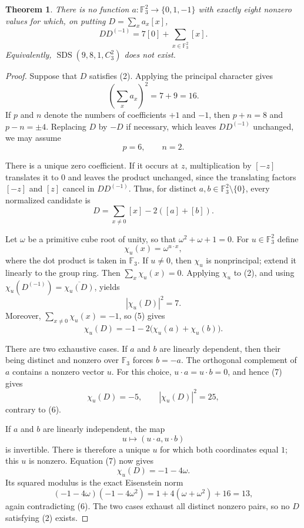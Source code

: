 \documentclass[11pt]{article}
\newtheorem{theorem}{Theorem}
\newcommand{\F}{\mathbb F}
\begin{document}
\begin{theorem}
There is no function $a\colon\F_3^2\to\{0,1,-1\}$ with exactly eight
nonzero values for which, on putting $D=\sum_x a_x[x]$,
\begin{equation}
 DD^{(-1)}=7[0]+\sum_{x\in\F_3^2}[x].
\end{equation}
Equivalently, $\operatorname{SDS}(9,8,1,C_3^2)$ does not exist.
\end{theorem}

\begin{proof}
Suppose that $D$ satisfies (2).  Applying the principal character gives
\begin{equation}
 \left(\sum_xa_x\right)^2=7+9=16.
\end{equation}
If $p$ and $n$ denote the numbers of coefficients $+1$ and $-1$, then
$p+n=8$ and $p-n=\pm4$.  Replacing $D$ by $-D$ if necessary, which leaves
$DD^{(-1)}$ unchanged, we may assume
\begin{equation}
 p=6,\qquad n=2.
\end{equation}

There is a unique zero coefficient.  If it occurs at $z$, multiplication by
$[-z]$ translates it to $0$ and leaves the product unchanged, since the
translating factors $[-z]$ and $[z]$ cancel in $DD^{(-1)}$.  Thus, for
distinct $a,b\in\F_3^2\setminus\{0\}$, every normalized candidate is
\begin{equation}
 D=\sum_{x\ne0}[x]-2([a]+[b]).
\end{equation}

Let $\omega$ be a primitive cube root of unity, so that
$\omega^2+\omega+1=0$.  For $u\in\F_3^2$ define
\[
 \chi_u(x)=\omega^{u\cdot x},
\]
where the dot product is taken in $\F_3$.  If $u\ne0$, then $\chi_u$ is
nonprincipal; extend it linearly to the group ring.  Then
$\sum_x\chi_u(x)=0$.  Applying $\chi_u$ to (2), and using
$\chi_u(D^{(-1)})=\overline{\chi_u(D)}$, yields
\begin{equation}
 |\chi_u(D)|^2=7.
\end{equation}
Moreover, $\sum_{x\ne0}\chi_u(x)=-1$, so (5) gives
\begin{equation}
 \chi_u(D)=-1-2\bigl(\chi_u(a)+\chi_u(b)\bigr).
\end{equation}

There are two exhaustive cases.  If $a$ and $b$ are linearly dependent,
then their being distinct and nonzero over $\F_3$ forces $b=-a$.  The
orthogonal complement of $a$ contains a nonzero vector $u$.  For this choice,
$u\cdot a=u\cdot b=0$, and hence (7) gives
\[
 \chi_u(D)=-5,\qquad |\chi_u(D)|^2=25,
\]
contrary to (6).

If $a$ and $b$ are linearly independent, the map
\[
 u\longmapsto(u\cdot a,u\cdot b)
\]
is invertible.  There is therefore a unique $u$ for which both coordinates
equal $1$; this $u$ is nonzero.  Equation (7) now gives
\[
 \chi_u(D)=-1-4\omega.
\]
Its squared modulus is the exact Eisenstein norm
\[
 (-1-4\omega)(-1-4\omega^2)
 =1+4(\omega+\omega^2)+16=13,
\]
again contradicting (6).  The two cases exhaust all distinct nonzero pairs,
so no $D$ satisfying (2) exists.
\end{proof}
\end{document}
